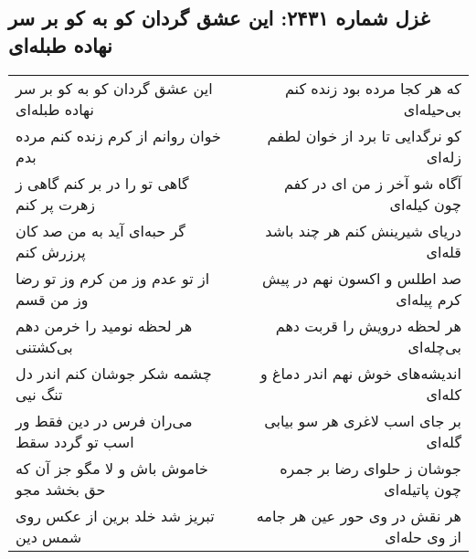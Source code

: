 \begin{center}
\section*{غزل شماره ۲۴۳۱: این عشق گردان کو به کو بر سر نهاده طبله‌ای}
\label{sec:2431}
\begin{longtable}{l p{0.5cm} r}
این عشق گردان کو به کو بر سر نهاده طبله‌ای
&&
که هر کجا مرده بود زنده کنم بی‌حیله‌ای
\\
خوان روانم از کرم زنده کنم مرده بدم
&&
کو نرگدایی تا برد از خوان لطفم زله‌ای
\\
گاهی تو را در بر کنم گاهی ز زهرت پر کنم
&&
آگاه شو آخر ز من ای در کفم چون کیله‌ای
\\
گر حبه‌ای آید به من صد کان پرزرش کنم
&&
دریای شیرینش کنم هر چند باشد قله‌ای
\\
از تو عدم وز من کرم وز تو رضا وز من قسم
&&
صد اطلس و اکسون نهم در پیش کرم پیله‌ای
\\
هر لحظه نومید را خرمن دهم بی‌کشتنی
&&
هر لحظه درویش را قربت دهم بی‌چله‌ای
\\
چشمه شکر جوشان کنم اندر دل تنگ نیی
&&
اندیشه‌های خوش نهم اندر دماغ و کله‌ای
\\
می‌ران فرس در دین فقط ور اسب تو گردد سقط
&&
بر جای اسب لاغری هر سو بیابی گله‌ای
\\
خاموش باش و لا مگو جز آن که حق بخشد مجو
&&
جوشان ز حلوای رضا بر جمره چون پاتیله‌ای
\\
تبریز شد خلد برین از عکس روی شمس دین
&&
هر نقش در وی حور عین هر جامه از وی حله‌ای
\\
\end{longtable}
\end{center}
